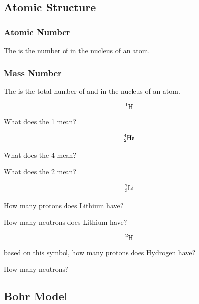 \documentclass[12pt]{exam}
\begin{document}
\twocolumn
    
\begin{questions}
        
\section{Atomic Structure}

\subsubsection{Atomic Number}


\question The  is the number of \fillin[protons][3cm] in the nucleus of an atom.

\subsubsection{Mass Number}

\question The  is the total number of \fillin[protons][2cm] and \fillin[neutrons][2cm]in the nucleus of an atom.


\question $$\ce{^{1}_{}H}$$
What does the 1 mean?


$$\ce{^{4}_{2}He}$$

\question What does the 4 mean? 


\question What does the 2 mean?

\fillin[\# of neutrons][6cm]


\question $$\ce{^{7}_{3}Li}$$

How many protons does Lithium have? \fillin[3][2cm]

How many neutrons does Lithium have? \fillin[7 - 3 = 4][2cm]

\question $$\ce{^{2}_{}H}$$ based on this symbol, how many protons does Hydrogen have? \fillin[1][1cm]

How many neutrons? \fillin[1][1cm]


\subsection{Bohr Model}


\end{questions}
\end{document}
